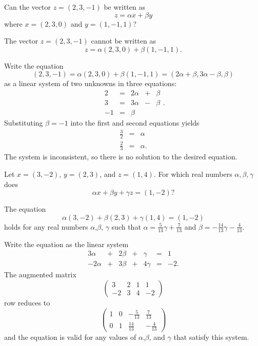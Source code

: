 \documentclass{ximera}
\begin{document}
\begin{exercise} \label{c4.3.4}
Can the vector $z=(2,3,-1)$ be written as
\[
z=\alpha x+ \beta y
\]
where $x=(2,3,0)$ and $y=(1,-1,1)$?

\begin{solution}

\ans The vector $z = (2,3,-1)$ cannot be written as
\[
z = \alpha(2,3,0) + \beta(1,-1,1).
\]

\soln Write the equation
\[ (2,3,-1) = \alpha(2,3,0) + \beta(1,-1,1) = 
(2\alpha + \beta, 3\alpha - \beta, \beta) \]
as a linear system of two unknowns in three equations:
\[ \begin{array}{rrrrr}
2 & = & 2\alpha & + & \beta \\
3 & = & 3\alpha & - & \beta \\
-1 & = & \beta \end{array}. \]
Substituting $\beta = -1$ into the first and second equations
yields
\[ \begin{array}{rcl}
\frac{3}{2} & = & \alpha \\
\frac{2}{3} & = & \alpha. \end{array} \]
The system is inconsistent, so there is no solution to the desired
equation.

\end{solution}
\end{exercise}

\begin{exercise} \label{c4.3.5}
Let $x=(3,-2)$, $y=(2,3)$, and $z=(1,4)$.  For which real
numbers $\alpha,\beta,\gamma$ does
\[
\alpha x + \beta y + \gamma z = (1,-2)?
\]

\begin{solution}

\ans The equation
\[ \alpha(3,-2) + \beta(2,3) + \gamma(1,4) = (1,-2) \]
holds for any real numbers $\alpha$,$\beta$,
$\gamma$ such that $\alpha = \frac{5}{13}\gamma +
\frac{7}{13}$ and $\beta = -\frac{14}{13}\gamma
- \frac{4}{13}$.

\soln Write the equation as the linear system
\[ \begin{array}{rrrrrrl}
3\alpha & + & 2\beta & + & \gamma & = & 1 \\
-2\alpha & + & 3\beta & + & 4\gamma & = & -2. \end{array} \]
The augmented matrix
\[ \left(\begin{array}{rrr|r}
3 & 2 & 1 & 1 \\
-2 & 3 & 4 & -2 \end{array}\right) \]
row reduces to
\[ \left(\begin{array}{rrr|r}
1 & 0 & -\frac{5}{13} & \frac{7}{13} \\
0 & 1 & \frac{14}{13} & -\frac{4}{13} \end{array}\right) \]
and the equation is valid for any values of $\alpha$,$\beta$,
and $\gamma$ that satisfy this system.

\end{solution}
\end{exercise}
\end{document}
